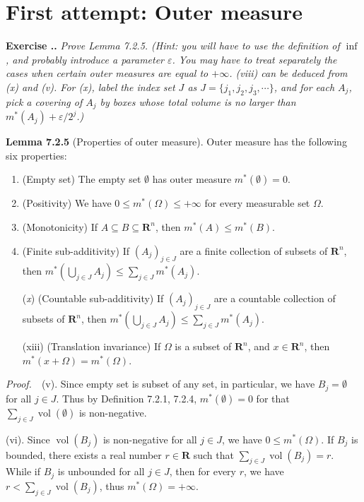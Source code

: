\documentclass{book}
\DeclareMathOperator{\vol}{vol}
\newcommand{\pff}{\vspace{.25em}\noindent\emph{Proof.}~~}
\newcommand{\titl}[1]{\noindent\textbf{#1}}
\newcounter{Exercise}[section]
\renewcommand{\theExercise}{\thesection.\arabic{Exercise}.}
\newcommand{\new}{\vspace{1.5em}\noindent\textbf{Exercise \stepcounter{Exercise}\textbf{\theExercise}} }
\begin{document}
\section{First attempt: Outer measure}

\new\emph{Prove Lemma 7.2.5. (Hint: you will have to use the definition of $\inf$, and probably introduce a parameter $\varepsilon$. You may have to treat separately the cases when certain outer measures are equal to $+\infty$. (viii) can be deduced from (x) and (v). For (x), label the index set $J$ as $J = \{j_1, j_2, j_3, \cdots\}$, and for each $A_j$, pick a covering of $A_j$ by boxes whose total volume is no larger than $m^*(A_j) + \varepsilon/2^j$.)}

\begin{framed}
\titl{Lemma 7.2.5} (Properties of outer measure). Outer measure has the following six properties:
\begin{enumerate}[label = (\roman*),resume*, start=5]
    \item (Empty set) The empty set $\emptyset$ has outer measure $m^*(\emptyset) = 0$.
    \item (Positivity) We have $0 \leq m^*(\Omega) \leq +\infty$ for every measurable set $\Omega$.
    \item (Monotonicity) If $A \subseteq B \subseteq \mathbf{R}^n$, then $m^*(A) \leq m^*(B)$.
    \item (Finite sub-additivity) If $(A_j)_{j \in J}$ are a finite collection of subsets of $\mathbf{R}^n$, then $m^*(\bigcup_{j \in J} A_j) \leq \sum_{j \in J} m^*(A_j)$.
    \item[(\emph{x})] (Countable sub-additivity) If $(A_j)_{j \in J}$ are a countable collection of subsets of $\mathbf{R}^n$, then $m^*(\bigcup_{j \in J} A_j) \leq \sum_{j \in J} m^*(A_j)$.
    \item[(xiii)] (Translation invariance) If $\Omega$ is a subset of $\mathbf{R}^n$, and $x \in \mathbf{R}^n$, then $m^*(x + \Omega) = m^*(\Omega)$.
\end{enumerate}
\end{framed}

\pff (v). Since empty set is subset of any set, in particular, we have $B_j = \emptyset$ for all $j \in J$. Thus by Definition 7.2.1, 7.2.4, $m^*(\emptyset) = 0$ for that $\sum_{j \in J} \vol(\emptyset)$ is non-negative.

(vi). Since $\vol(B_j)$ is non-negative for all $j \in J$, we have $0 \leq m^*(\Omega)$. If $B_j$ is bounded, there exists a real number $r \in \mathbf{R}$ such that $\sum_{j \in J} \vol(B_j) = r$. While if $B_j$ is unbounded for all $j \in J$, then for every $r$, we have $r<\sum_{j \in J} \vol(B_j)$, thus $m^*(\Omega) = +\infty$.
\end{document}
